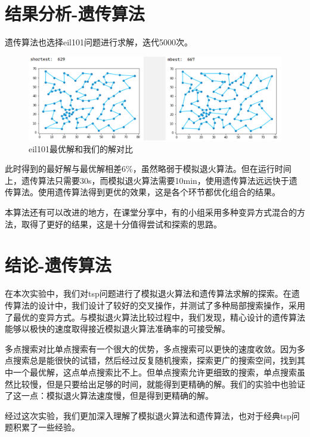 \documentclass[withoutpreface,bwprint]{cumcmthesis} %
\begin{document}
\section{结果分析-遗传算法}
遗传算法也选择eil101问题进行求解，迭代5000次。
\begin{figure}[H]
		\centering
		\includegraphics[width=1\linewidth]{compare}
		\caption{eil101最优解和我们的解对比}
\end{figure}
此时得到的最好解与最优解相差6\%，虽然略弱于模拟退火算法。但在运行时间上，遗传算法只需要30s，而模拟退火算法需要10min，使用遗传算法远远快于遗传算法。使用遗传算法得到更优的效果，这是各个环节都优化组合的结果。\par
本算法还有可以改进的地方，在课堂分享中，有的小组采用多种变异方式混合的方法，取得了更好的结果，这是十分值得尝试和探索的思路。

\section{结论-遗传算法}
	在本次实验中，我们对tsp问题进行了模拟退火算法和遗传算法求解的探索。在遗传算法的设计中，我们设计了较好的交叉操作，并测试了多种局部搜索操作，采用了最优的变异方式。与模拟退火算法比较过程中，我们发现，精心设计的遗传算法能够以极快的速度取得接近模拟退火算法准确率的可接受解。\par
	多点搜索对比单点搜索有一个很大的优势，多点搜索可以更快的速度收敛。因为多点搜索总是能很快的试错，然后经过反复随机搜索，探索更广的搜索空间，找到其中一个最优解，这点单点搜索比不上。但单点搜索允许更细致的搜索，单点搜索虽然比较慢，但是只要给出足够的时间，就能得到更精确的解。我们的实验中也验证了这一点：模拟退火算法速度慢，但是得到更精确的解。\par
	经过这次实验，我们更加深入理解了模拟退火算法和遗传算法，也对于经典tsp问题积累了一些经验。
	
   
\end{document}
